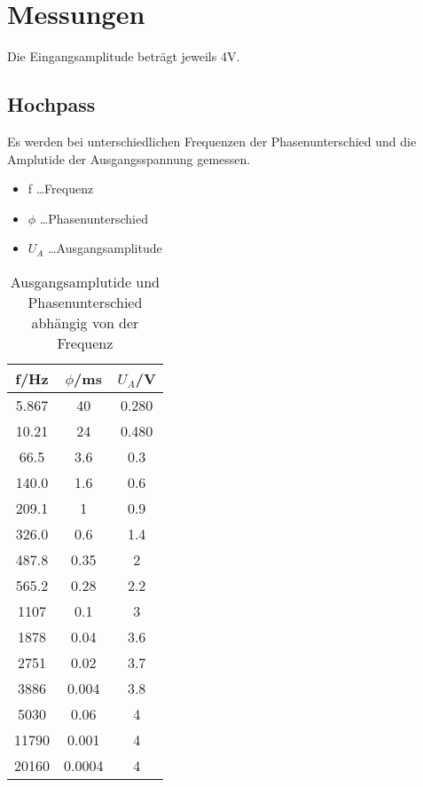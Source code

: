 \documentclass[a4paper]{article}
\begin{document}
\section{Messungen}
Die Eingangsamplitude beträgt jeweils 4V.
\subsection{Hochpass}
Es werden bei unterschiedlichen Frequenzen der Phasenunterschied und die Amplutide der Ausgangsspannung gemessen.

\begin{table}[ht]
  \centering
  \caption{Ausgangsamplutide und Phasenunterschied abhängig von der Frequenz}
  \begin{itemize}
    \item f \dots Frequenz
    \item $\phi$ \dots Phasenunterschied
    \item $U_A$ \dots Ausgangsamplitude
  \end{itemize}
  \begin{tabular}{|c|c|c|}
    \hline
    f/Hz&$\phi$/ms&$U_A$/V\\
    \hline
    5.867&40&0.280\\
    \hline
    10.21&24&0.480\\
    \hline
    66.5&3.6&0.3\\
    \hline
    140.0&1.6&0.6\\
    \hline
    209.1&1&0.9\\
    \hline
    326.0&0.6&1.4\\
    \hline
    487.8&0.35&2\\
    \hline
    565.2&0.28&2.2\\
    \hline
    1107&0.1&3\\
    \hline
    1878&0.04&3.6\\
    \hline
    2751&0.02&3.7\\
    \hline
    3886&0.004&3.8\\
    \hline
    5030&0.06&4\\
    \hline
    11790&0.001&4\\
    \hline
    20160&0.0004&4\\
    \hline
  \end{tabular}
  \label{tab:1}
\end{table}
\newpage
\end{document}
